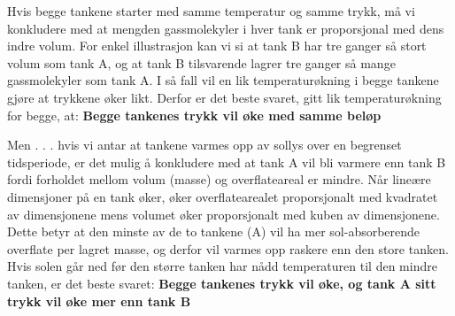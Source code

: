 
Hvis begge tankene starter med samme temperatur og samme trykk, må vi konkludere med at mengden gassmolekyler i hver tank er proporsjonal med dens indre volum.  For enkel illustrasjon kan vi si at tank B har tre ganger så stort volum som tank A, og at tank B tilsvarende lagrer tre ganger så mange gassmolekyler som tank A.  I så fall vil en lik temperaturøkning i begge tankene gjøre at trykkene øker likt.  Derfor er det beste svaret, gitt lik temperaturøkning for begge, at: {\bf Begge tankenes trykk vil øke med samme beløp}

\vskip 10pt

Men . . . hvis vi antar at tankene varmes opp av sollys over en begrenset tidsperiode, er det mulig å konkludere med at tank A vil bli varmere enn tank B fordi forholdet mellom volum (masse) og overflateareal er mindre.  Når lineære dimensjoner på en tank øker, øker overflatearealet proporsjonalt med kvadratet av dimensjonene mens volumet øker proporsjonalt med kuben av dimensjonene.  Dette betyr at den minste av de to tankene (A) vil ha mer sol-absorberende overflate per lagret masse, og derfor vil varmes opp raskere enn den store tanken.  Hvis solen går ned før den større tanken har nådd temperaturen til den mindre tanken, er det beste svaret: {\bf Begge tankenes trykk vil øke, og tank A sitt trykk vil øke mer enn tank B}


